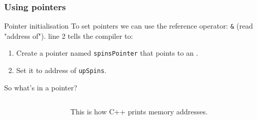 \documentclass{beamer}
\begin{document}
\begin{frame}[fragile]
  \frametitle{Using pointers}
  \begin{block}{Pointer initialisation}
	  To set pointers we can use the reference operator: \texttt{\&} (read "address of").
	  line 2 tells the compiler to:
	  \begin{enumerate}
	    \pause
	    \item{Create a pointer named \texttt{spinsPointer} that points to an .}
	    \pause
	    \item{Set it to address of \texttt{upSpins}.}
	  \end{enumerate}
  \end{block}
  \pause
  \begin{block}{So what's in a pointer?}
	  \begin{columns}[t]
	    \begin{column}[T]{0.5\textwidth}
			  
			\end{column}\pause
			\begin{column}[T]{0.5\textwidth}
			  \newline
			  This is how C++ prints memory addresses.
	    \end{column}
	  \end{columns}
  \end{block}
\end{frame}
\end{document}
